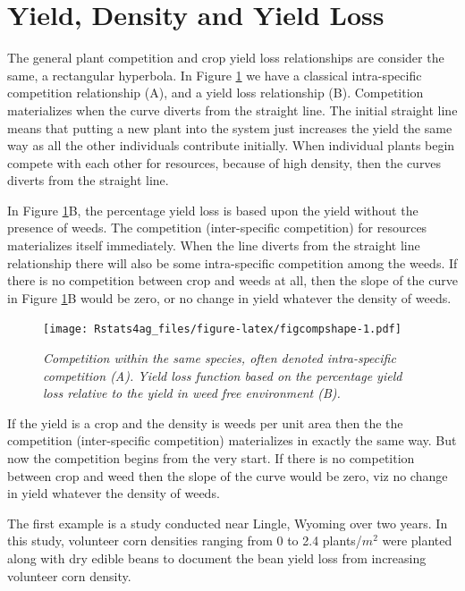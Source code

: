 \documentclass[letterpaper,]{book}
\begin{document}
\hypertarget{yield-density-and-yield-loss}{%
\section{Yield, Density and Yield Loss}\label{yield-density-and-yield-loss}}

The general plant competition and crop yield loss relationships are consider the same, a rectangular hyperbola. In Figure \ref{fig:figcompshape} we have a classical intra-specific competition relationship (A), and a yield loss relationship (B). Competition materializes when the curve diverts from the straight line. The initial straight line means that putting a new plant into the system just increases the yield the same way as all the other individuals contribute initially. When individual plants begin compete with each other for resources, because of high density, then the curves diverts from the straight line.

In Figure \ref{fig:figcompshape}B, the percentage yield loss is based upon the yield without the presence of weeds. The competition (inter-specific competition) for resources materializes itself immediately. When the line diverts from the straight line relationship there will also be some intra-specific competition among the weeds. If there is no competition between crop and weeds at all, then the slope of the curve in Figure \ref{fig:figcompshape}B would be zero, or no change in yield whatever the density of weeds.



\begin{figure}
\centering
\texttt{[image: Rstats4ag\_files/figure-latex/figcompshape-1.pdf]}
\caption{\label{fig:figcompshape}\emph{Competition within the same species, often denoted intra-specific competition (A). Yield loss function based on the percentage yield loss relative to the yield in weed free environment (B).}}
\end{figure}

If the yield is a crop and the density is weeds per unit area then the the competition (inter-specific competition) materializes in exactly the same way. But now the competition begins from the very start. If there is no competition between crop and weed then the slope of the curve would be zero, viz no change in yield whatever the density of weeds.

The first example is a study conducted near Lingle, Wyoming over two years. In this study, volunteer corn densities ranging from 0 to 2.4 plants/\(m^2\) were planted along with dry edible beans to document the bean yield loss from increasing volunteer corn density.
\end{document}
